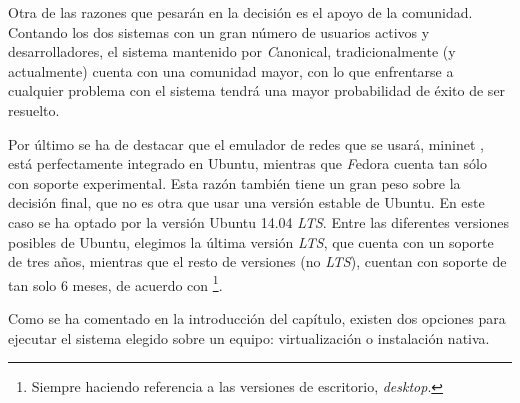 \documentclass[a4paper,11pt]{book}
\begin{document}
Otra de las razones que pesarán en la decisión es el apoyo de la comunidad. Contando los dos sistemas con un gran número de usuarios activos y desarrolladores, el sistema mantenido por \textit{C}anonical, tradicionalmente (y actualmente) cuenta con una comunidad mayor, con lo que enfrentarse a cualquier problema con el sistema tendrá una mayor probabilidad de éxito de ser resuelto.

Por último se ha de destacar que el emulador de redes que se usará, mininet \cite{mininet}, está perfectamente integrado en Ubuntu, mientras que \textit{F}edora cuenta tan sólo con soporte experimental. Esta razón también tiene un gran peso sobre la decisión final, que no es otra que usar una versión estable de Ubuntu. En este caso se ha optado por la versión Ubuntu 14.04 \textit{LTS}. Entre las diferentes versiones posibles de Ubuntu, elegimos la última versión \textit{LTS}, que cuenta con un soporte de tres años, mientras que el resto de versiones (no \textit{LTS}), cuentan con soporte de tan solo 6 meses, de acuerdo con \cite{ubuntuLTS}\footnote{Siempre haciendo referencia a las versiones de escritorio, \textit{desktop}.}.

Como se ha comentado en la introducción del capítulo, existen dos opciones para ejecutar el sistema elegido sobre un equipo: virtualización o instalación nativa.
\end{document}
